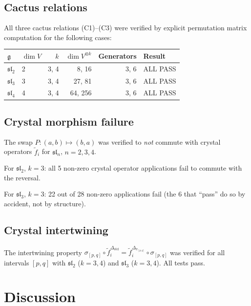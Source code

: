 \documentclass[11pt]{article}
\theoremstyle{remark}
\begin{document}
\subsection{Cactus relations}

All three cactus relations (C1)--(C3) were verified by explicit
permutation matrix computation for the following cases:

\begin{center}
\begin{tabular}{@{}llrrrl@{}}
  \toprule
  $\mathfrak{g}$ & $\dim V$ & $k$ & $\dim V^{\otimes k}$ & Generators & Result \\
  \midrule
  $\mathfrak{sl}_2$ & 2 & 3, 4 & 8, 16 & 3, 6 & ALL PASS \\
  $\mathfrak{sl}_3$ & 3 & 3, 4 & 27, 81 & 3, 6 & ALL PASS \\
  $\mathfrak{sl}_4$ & 4 & 3, 4 & 64, 256 & 3, 6 & ALL PASS \\
  \bottomrule
\end{tabular}
\end{center}

\subsection{Crystal morphism failure}

The swap $P\colon (a,b) \mapsto (b,a)$ was verified to \emph{not}
commute with crystal operators $\tilde{f}_i$ for
$\mathfrak{sl}_n$, $n = 2, 3, 4$.

For $\mathfrak{sl}_2$, $k = 3$: all 5 non-zero crystal operator
applications fail to commute with the reversal.

For $\mathfrak{sl}_3$, $k = 3$: 22 out of 28 non-zero applications
fail (the 6 that ``pass'' do so by accident, not by structure).

\subsection{Crystal intertwining}

The intertwining property
$\sigma_{[p,q]} \circ \tilde{f}_i^{\Delta_{\mathrm{std}}}
= \tilde{f}_i^{\Delta_{\pi_{[p,q]}}} \circ \sigma_{[p,q]}$
was verified for all intervals $[p,q]$ with $\mathfrak{sl}_2$
($k = 3, 4$) and $\mathfrak{sl}_3$ ($k = 3, 4$). All tests pass.

\section{Discussion}
\end{document}
